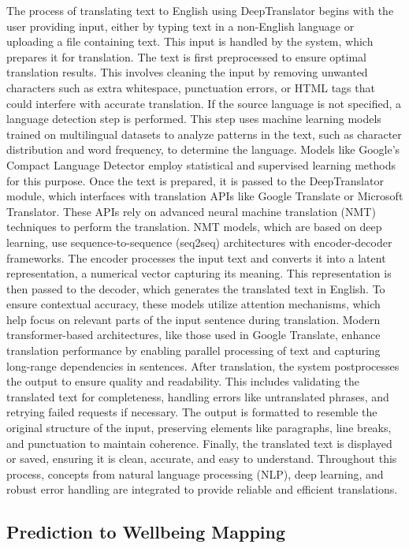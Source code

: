 \noindent
The process of translating text to English using DeepTranslator begins with the user providing input, either by typing text in a non-English language or uploading a file containing text. This input is handled by the system, which prepares it for translation. The text is first preprocessed to ensure optimal translation results. This involves cleaning the input by removing unwanted characters such as extra whitespace, punctuation errors, or HTML tags that could interfere with accurate translation. If the source language is not specified, a language detection step is performed. This step uses machine learning models trained on multilingual datasets to analyze patterns in the text, such as character distribution and word frequency, to determine the language. Models like Google’s Compact Language Detector employ statistical and supervised learning methods for this purpose. Once the text is prepared, it is passed to the DeepTranslator module, which interfaces with translation APIs like Google Translate or Microsoft Translator. These APIs rely on advanced neural machine translation (NMT) techniques to perform the translation. NMT models, which are based on deep learning, use sequence-to-sequence (seq2seq) architectures with encoder-decoder frameworks. The encoder processes the input text and converts it into a latent representation, a numerical vector capturing its meaning. This representation is then passed to the decoder, which generates the translated text in English. To ensure contextual accuracy, these models utilize attention mechanisms, which help focus on relevant parts of the input sentence during translation. Modern transformer-based architectures, like those used in Google Translate, enhance translation performance by enabling parallel processing of text and capturing long-range dependencies in sentences. After translation, the system postprocesses the output to ensure quality and readability. This includes validating the translated text for completeness, handling errors like untranslated phrases, and retrying failed requests if necessary. The output is formatted to resemble the original structure of the input, preserving elements like paragraphs, line breaks, and punctuation to maintain coherence. Finally, the translated text is displayed or saved, ensuring it is clean, accurate, and easy to understand. Throughout this process, concepts from natural language processing (NLP), deep learning, and robust error handling are integrated to provide reliable and efficient translations.


\subsection{Prediction to Wellbeing Mapping}

